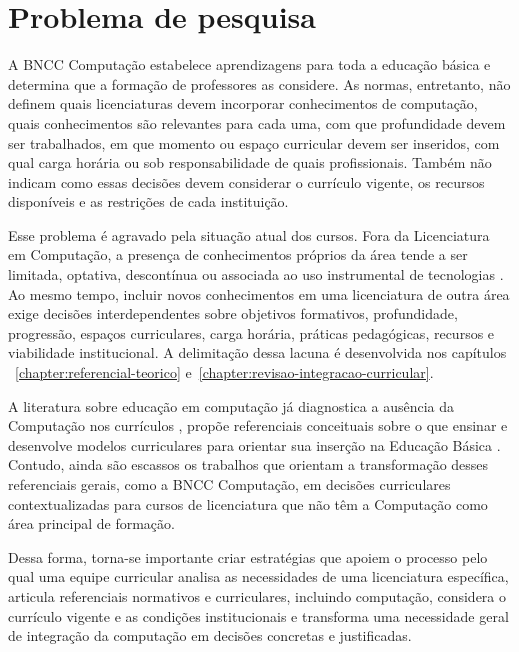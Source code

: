 \section{Problema de pesquisa}
\label{sec:problema-pesquisa}

A BNCC Computação estabelece aprendizagens para toda a educação básica e determina que a formação de professores as considere. As normas, entretanto, não definem quais licenciaturas devem incorporar conhecimentos de computação, quais conhecimentos são relevantes para cada uma, com que profundidade devem ser trabalhados, em que momento ou espaço curricular devem ser inseridos, com qual carga horária ou sob responsabilidade de quais profissionais. Também não indicam como essas decisões devem considerar o currículo vigente, os recursos disponíveis e as restrições de cada instituição.

Esse problema é agravado pela situação atual dos cursos. Fora da Licenciatura em Computação, a presença de conhecimentos próprios da área tende a ser limitada, optativa, descontínua ou associada ao uso instrumental de tecnologias \cite{delgado2026computacao}. Ao mesmo tempo, incluir novos conhecimentos em uma licenciatura de outra área exige decisões interdependentes sobre objetivos formativos, profundidade, progressão, espaços curriculares, carga horária, práticas pedagógicas, recursos e viabilidade institucional. A delimitação dessa lacuna é desenvolvida nos capítulos ~\ref{chapter:referencial-teorico} e~\ref{chapter:revisao-integracao-curricular}.

A literatura sobre educação em computação já diagnostica a ausência da Computação nos currículos \cite{delgado2026computacao}, propõe referenciais conceituais sobre o que ensinar e desenvolve modelos curriculares para orientar sua inserção na Educação Básica \cite{k2016k, NewZealandMoE2017, ribeiro2019diretrizes, abrantes2024pensamento}. Contudo, ainda são escassos os trabalhos que orientam a transformação desses referenciais gerais, como a BNCC Computação, em decisões curriculares contextualizadas para cursos de licenciatura que não têm a Computação como área principal de formação.

Dessa forma, torna-se importante criar estratégias que apoiem o processo pelo qual uma equipe curricular analisa as necessidades de uma licenciatura específica, articula referenciais normativos e curriculares, incluindo computação, considera o currículo vigente e as condições institucionais e transforma uma necessidade geral de integração da computação em decisões concretas e justificadas.

